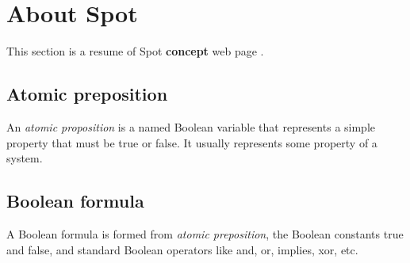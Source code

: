 \section{About Spot}
This section is a resume of Spot \textbf{concept} web page \cite{8}.

\subsection{Atomic preposition}
An \textit{atomic proposition} is a named Boolean variable that represents a simple property that must be
true or false. It usually represents some property of a system.

\subsection{Boolean formula}
A Boolean formula is formed from \textit{atomic preposition}, the Boolean constants true and false, and
standard Boolean operators like and, or, implies, xor, etc.